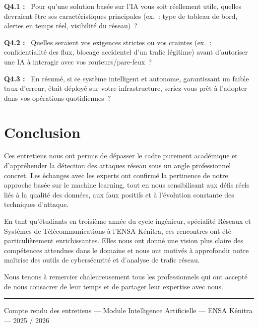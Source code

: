 \documentclass[12pt,a4paper]{article}
\newcommand{\og}{\guillemotleft\,}
\newcommand{\fg}{\,\guillemotright}
\begin{document}
\textbf{Q4.1 :} \og{} Pour qu'une solution bas\'{e}e sur l'IA vous soit r\'{e}ellement utile, quelles
devraient \^{e}tre ses caract\'{e}ristiques principales (ex.~: type de tableau de bord, alertes en
temps r\'{e}el, visibilit\'{e} du r\'{e}seau)~? \fg{}

\bigskip

\textbf{Q4.2 :} \og{} Quelles seraient vos exigences strictes ou vos craintes (ex.~: confidentialit\'{e}
des flux, blocage accidentel d'un trafic l\'{e}gitime) avant d'autoriser une IA \`{a} interagir avec vos
routeurs/pare-feux~? \fg{}

\bigskip

\textbf{Q4.3 :} \og{} En r\'{e}sum\'{e}, si ce syst\`{e}me intelligent et autonome, garantissant un faible taux
d'erreur, \'{e}tait d\'{e}ploy\'{e} sur votre infrastructure, seriez-vous pr\^{e}t \`{a} l'adopter dans vos
op\'{e}rations quotidiennes~? \fg{}

\clearpage

\section*{Conclusion}

Ces entretiens nous ont permis de d\'{e}passer le cadre purement acad\'{e}mique et d'appr\'{e}hender
la d\'{e}tection des attaques r\'{e}seau sous un angle professionnel concret. Les \'{e}changes avec les
experts ont confirm\'{e} la pertinence de notre approche bas\'{e}e sur le machine learning, tout en
nous sensibilisant aux d\'{e}fis r\'{e}els li\'{e}s \`{a} la qualit\'{e} des donn\'{e}es, aux faux positifs et \`{a}
l'\'{e}volution constante des techniques d'attaque.

En tant qu'\'{e}tudiants en troisi\`{e}me ann\'{e}e du cycle ing\'{e}nieur, sp\'{e}cialit\'{e} R\'{e}seaux et Syst\`{e}mes
de T\'{e}l\'{e}communications \`{a} l'ENSA K\'{e}nitra, ces rencontres ont \'{e}t\'{e} particuli\`{e}rement
enrichissantes. Elles nous ont donn\'{e} une vision plus claire des comp\'{e}tences attendues dans
le domaine et nous ont motiv\'{e}s \`{a} approfondir notre ma\^{i}trise des outils de cybers\'{e}curit\'{e} et
d'analyse de trafic r\'{e}seau.

Nous tenons \`{a} remercier chaleureusement tous les professionnels qui ont accept\'{e} de nous
consacrer de leur temps et de partager leur expertise avec nous.

\vspace{2em}
\noindent\rule{\linewidth}{0.4pt}
\begin{center}
  \small Compte rendu des entretiens ---
  Module Intelligence Artificielle ---
  ENSA K\'{e}nitra --- 2025 / 2026
\end{center}
\end{document}
